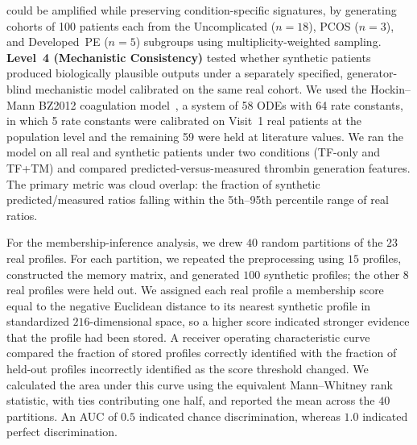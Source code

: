 could be amplified while preserving condition-specific signatures, by generating
cohorts of 100 patients each from the Uncomplicated ($n{=}18$), PCOS ($n{=}3$), and
Developed~PE ($n{=}5$) subgroups using multiplicity-weighted sampling. \textbf{Level~4 (Mechanistic
Consistency)} tested whether synthetic patients produced biologically plausible
outputs under a separately specified, generator-blind mechanistic model calibrated
on the same real cohort. We used the Hockin--Mann BZ2012
coagulation model~\citep{Hockin2002,BrummelZiedins2012}, a system of 58 ODEs with 64 rate
constants, in which 5 rate constants were calibrated on Visit~1 real patients at the
population level and the remaining 59 were held at literature values. We ran the model
on all real and synthetic patients under two conditions (TF-only and TF+TM) and
compared predicted-versus-measured thrombin generation features. The primary metric
was cloud overlap: the fraction of synthetic predicted/measured ratios falling
within the 5th--95th percentile range of real ratios.

For the membership-inference analysis, we drew $40$ random partitions of the $23$ real
profiles. For each partition, we repeated the preprocessing using $15$ profiles, constructed
the memory matrix, and generated $100$ synthetic profiles; the other $8$ real profiles were
held out. We assigned each real profile a membership score equal to the negative Euclidean
distance to its nearest synthetic profile in standardized $216$-dimensional space, so a
higher score indicated stronger evidence that the profile had been stored. A receiver
operating characteristic curve compared the fraction of stored profiles correctly identified
with the fraction of held-out profiles incorrectly identified as the score threshold changed.
We calculated the area under this curve using the equivalent Mann--Whitney rank statistic,
with ties contributing one half, and reported the mean across the $40$ partitions. An AUC of
$0.5$ indicated chance discrimination, whereas $1.0$ indicated perfect discrimination.

